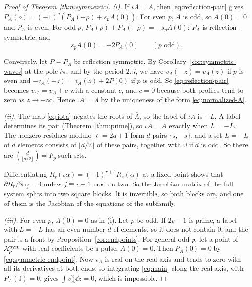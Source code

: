 \begin{proof}[Proof of Theorem~\ref{thm:symmetric}]
\emph{(i).} If \(\iota A=A\), then \eqref{eq:reflection-pair} gives
\(P_A(\rho)=(-1)^p(P_A(-\rho)+s_pA(0))\). For even \(p\), \(A\) is odd,
so \(A(0)=0\) and \(P_A\) is even. For odd \(p\),
\(P_A(\rho)+P_A(-\rho)=-s_pA(0)\): \(P_A\) is reflection-symmetric, and
\begin{equation}\label{eq:symmetric-endpoint}
 s_pA(0)=-2P_A(0)\qquad(p\text{ odd}).
\end{equation}

Conversely, let \(P=P_A\) be reflection-symmetric. By
Corollary~\ref{cor:symmetric-waves} at the pole \(i\pi\), and by the
period \(2\pi i\), we have \(v_A(-z)=v_A(z)\) if \(p\) is even and
\(-v_A(-z)=v_A(z)+2P(0)\) if \(p\) is odd. So \eqref{eq:reflection-pair}
becomes \(v_{\iota A}=v_A+c\) with a constant \(c\), and \(c=0\) because
both profiles tend to zero as \(z\to-\infty\). Hence \(\iota A=A\) by
the uniqueness of the form \eqref{eq:normalized-A}.

\emph{(ii).} The map \eqref{eq:iota} negates the roots of
\(\overline A\), so the label of \(\iota A\) is \(-L\). A label
determines its pair (Theorem~\ref{thm:prime}), so \(\iota A=A\) exactly
when \(L=-L\). The nonzero residues modulo \(\ell=2d+1\) form \(d\)
pairs \(\{s,-s\}\), and a set \(L=-L\) of \(d\) elements consists of
\(\lfloor d/2\rfloor\) of these pairs, together with \(0\) if \(d\) is
odd. So there are \(\binom{d}{\lfloor d/2\rfloor}=F_p\) such sets.

Differentiating \(R_r(\iota\alpha)=(-1)^{r+1}R_r(\alpha)\) at a fixed
point shows that \(\partial R_r/\partial\alpha_j=0\) unless
\(j\equiv r+1\) modulo two. So the Jacobian matrix of the full system
splits into two square blocks. It is invertible, so both blocks are, and
one of them is the Jacobian of the equations of the subfamily.

\emph{(iii).} For even \(p\), \(A(0)=0\) as in (i). Let \(p\) be odd. If
\(2p-1\) is prime, a label with \(L=-L\) has an even number \(d\) of
elements, so it does not contain \(0\), and the pair is a front by
Proposition~\ref{cor:endpoints}. For general odd \(p\), let a point of
\(\mathcal X_p^{\mathrm{sym}}\) with real coefficients be a pulse, \(A(0)=0\).
Then \(P_A(0)=0\) by \eqref{eq:symmetric-endpoint}. Now \(v_A\) is real
on the real axis and tends to zero with all its derivatives at both
ends, so integrating \eqref{eq:main} along the real axis, with
\(P_A(0)=0\), gives \(\int v_A^2\dd z=0\), which is impossible.
\end{proof}

